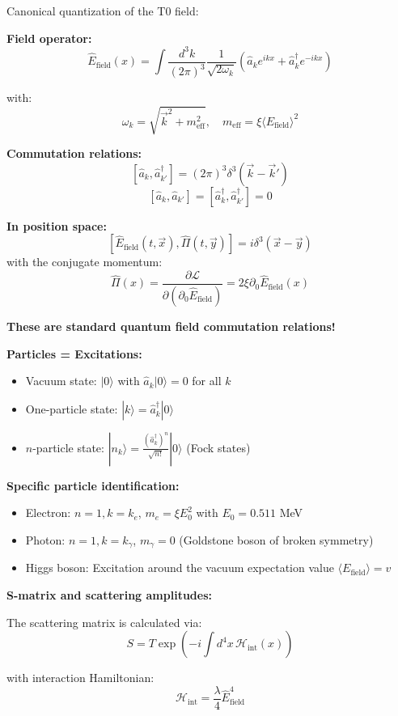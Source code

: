 	Canonical quantization of the T0 field:
	
	\textbf{Field operator:}
	\[
	\hat{E}_{\text{field}}(x) = \int \frac{d^3k}{(2\pi)^3} \frac{1}{\sqrt{2\omega_k}} \left(\hat{a}_k e^{ikx} + \hat{a}^\dagger_k e^{-ikx}\right)
	\]
	
	with:
	\[
	\omega_k = \sqrt{\vec{k}^2 + m_{\text{eff}}^2}, \quad m_{\text{eff}} = \xi \langle E_{\text{field}} \rangle^2
	\]
	
	\textbf{Commutation relations:}
	\[
	[\hat{a}_k, \hat{a}^\dagger_{k'}] = (2\pi)^3 \delta^3(\vec{k} - \vec{k}')
	\]
	\[
	[\hat{a}_k, \hat{a}_{k'}] = [\hat{a}^\dagger_k, \hat{a}^\dagger_{k'}] = 0
	\]
	
	\textbf{In position space:}
	\[
	[\hat{E}_{\text{field}}(t, \vec{x}), \hat{\Pi}(t, \vec{y})] = i \delta^3(\vec{x} - \vec{y})
	\]
	with the conjugate momentum:
	\[
	\hat{\Pi}(x) = \frac{\partial \mathcal{L}}{\partial (\partial_0 \hat{E}_{\text{field}})} = 2\xi \partial_0 \hat{E}_{\text{field}}(x)
	\]
	
	\textbf{These are standard quantum field commutation relations!}
	
	\textbf{Particles = Excitations:}
	\begin{itemize}
		\item Vacuum state: $|0\rangle$ with $\hat{a}_k |0\rangle = 0$ for all $k$
		\item One-particle state: $|k\rangle = \hat{a}^\dagger_k |0\rangle$
		\item $n$-particle state: $|n_k\rangle = \frac{(\hat{a}^\dagger_k)^n}{\sqrt{n!}} |0\rangle$ (Fock states)
	\end{itemize}
	
	\textbf{Specific particle identification:}
	\begin{itemize}
		\item Electron: $n=1, k=k_e$, $m_e = \xi E_0^2$ with $E_0 = 0.511$ MeV
		\item Photon: $n=1, k=k_\gamma$, $m_\gamma = 0$ (Goldstone boson of broken symmetry)
		\item Higgs boson: Excitation around the vacuum expectation value $\langle E_{\text{field}} \rangle = v$
	\end{itemize}
	
	\textbf{S-matrix and scattering amplitudes:}
	
	The scattering matrix is calculated via:
	\[
	S = T \exp\left(-i \int d^4x \, \mathcal{H}_{\text{int}}(x)\right)
	\]
	
	with interaction Hamiltonian:
	\[
	\mathcal{H}_{\text{int}} = \frac{\lambda}{4} \hat{E}_{\text{field}}^4
	\]
	

